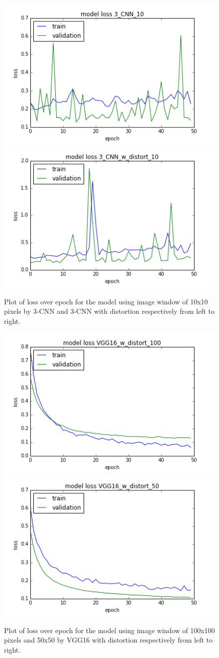 \documentclass{sigkddExp}
\begin{document}
\begin{figure}[htbp!]
\centering
  \includegraphics[width=0.3\linewidth]{3_CNN_10_loss.png}
  \includegraphics[width=0.3\linewidth]{3_CNN_w_distort_10_loss.png}
  \caption{Plot of loss over epoch for the model using image window of 10x10 pixels by 3-CNN and 3-CNN with distortion respectively from left to right.}
  \label{fig:loss_10}
\end{figure}
\begin{figure}[htbp!]
\centering
  \includegraphics[width=0.3\linewidth]{VGG16_w_distort_100_loss.png}
  \includegraphics[width=0.3\linewidth]{VGG16_w_distort_50_loss.png}
  \caption{Plot of loss over epoch for the model using image window of 100x100 pixels  and 50x50 by VGG16 with distortion respectively from left to right.}
  \label{fig:loss_VGG}
\end{figure}


\end{document}
